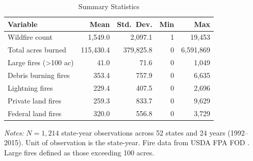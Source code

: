 \begin{table}[H]
\centering
\caption{Summary Statistics}
\label{tab:summary}
\begin{threeparttable}
\begin{tabular}{l rrrr}
\toprule
Variable & Mean & Std.\ Dev. & Min & Max \\
\midrule
Wildfire count & 1,549.0 & 2,097.1 & 1 & 19,453 \\
Total acres burned & 115,430.4 & 379,825.8 & 0 & 6,591,869 \\
Large fires (>100 ac) & 41.0 & 71.6 & 0 & 1,049 \\
Debris burning fires & 353.4 & 757.9 & 0 & 6,635 \\
Lightning fires & 229.4 & 407.5 & 0 & 2,696 \\
Private land fires & 259.3 & 833.7 & 0 & 9,629 \\
Federal land fires & 320.0 & 556.8 & 0 & 3,729 \\
\bottomrule
\end{tabular}
\begin{tablenotes}[flushleft]
\small
\item \textit{Notes:} $N = 1,214$ state-year observations across 52 states and 24 years (1992--2015). Unit of observation is the state-year. Fire data from USDA FPA FOD \citep{Short2017}. Large fires defined as those exceeding 100 acres.
\end{tablenotes}
\end{threeparttable}
\end{table}
